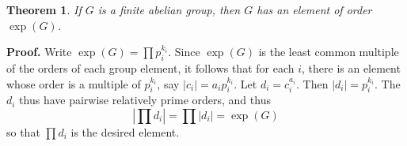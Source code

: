 \documentclass[12pt]{article}
\newtheorem{thm}{Theorem}
\begin{document}
\begin{thm} If $G$ is a finite abelian group, then $G$ has an element of order $\exp(G)$.
\end{thm}
\textbf{Proof. } Write $\exp(G)=\prod p_i^{k_i}$. Since $\exp(G)$ is the least common multiple of the orders of each group element, it follows that for each $i$, there is an element whose order is a multiple of $p_i^{k_i}$, say $\lvert c_i\rvert=a_i p_i^{k_i}$. Let $d_i=c_i^{a_i}$. Then $\lvert d_i\rvert=p_i^{k_i}$. The $d_i$ thus have pairwise relatively prime orders, and thus
\[\left\lvert\prod d_i\right\rvert=\prod\left\lvert d_i\right\rvert=\exp(G)\]
so that $\prod d_i$ is the desired element.

\end{document}
